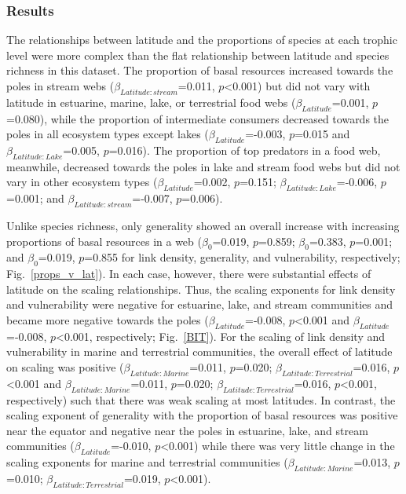 \documentclass[12pt]{article}
\begin{document}
  \subsubsection*{Results}

    The relationships between latitude and the proportions of species at each
    trophic level were more complex than the flat relationship between latitude
    and species richness in this dataset.  The proportion of basal resources
    increased towards the poles in stream webs
    ($\beta_{Latitude:stream}$=0.011, $p$\textless0.001)  but did not vary
    with latitude in estuarine, marine, lake, or terrestrial  food webs
    ($\beta_{Latitude}$=0.001, $p$=0.080), while the proportion of
    intermediate consumers decreased towards the poles in all ecosystem types
    except lakes ($\beta_{Latitude}$=-0.003, $p$=0.015 and
    $\beta_{Latitude:Lake}$=0.005, $p$=0.016). The proportion of top predators
    in a food web,  meanwhile, decreased towards the poles in lake and  stream
    food webs but did not vary in other ecosystem types
    ($\beta_{Latitude}$=0.002, $p$=0.151;  $\beta_{Latitude:Lake}$=-0.006,
    $p$=0.001; and $\beta_{Latitude:stream}$=-0.007, $p$=0.006).


    Unlike species richness, only generality showed an overall increase with
    increasing proportions of basal resources in a web ($\beta_0$=0.019,
    $p$=0.859; $\beta_0$=0.383, $p$=0.001; and $\beta_0$=0.019, $p$=0.855 for
    link density, generality, and vulnerability, respectively;
    Fig.~\ref{props_v_lat}). In each case, however, there were substantial
    effects of latitude on the scaling relationships. Thus, the scaling
    exponents for link density and vulnerability were negative for estuarine,
    lake, and stream communities and became more negative towards the poles
    ($\beta_{Latitude}$=-0.008, $p$\textless0.001 and $\beta_{Latitude}$=-0.008,
    $p$\textless0.001, respectively; Fig.~\ref{BIT}). For the scaling of link
    density and vulnerability in marine and terrestrial communities, the overall
    effect of latitude on scaling was positive ($\beta_{Latitude:Marine}$=0.011,
    $p$=0.020; $\beta_{Latitude:Terrestrial}$=0.016, $p$\textless0.001 and
    $\beta_{Latitude:Marine}$=0.011, $p$=0.020;
    $\beta_{Latitude:Terrestrial}$=0.016, $p$\textless0.001, respectively) such
    that there was weak scaling at most latitudes. In contrast, the scaling
    exponent of generality with the proportion of basal resources was positive
    near the equator and negative near the poles in estuarine, lake, and stream
    communities ($\beta_{Latitude}$=-0.010, $p$\textless0.001) while there was
    very little change in the scaling exponents for marine and terrestrial
    communities ($\beta_{Latitude:Marine}$=0.013, $p$=0.010;
    $\beta_{Latitude:Terrestrial}$=0.019, $p$\textless0.001).
\end{document}
